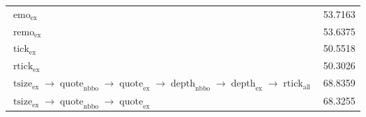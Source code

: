 \begin{tabular}{p{6cm}S}
    $\operatorname{emo}_{\text{ex}}$                                                                                                                                                                                                 & 53.7163    \\
    $\operatorname{remo}_{\text{ex}}$                                                                                                                                                                                                & 53.6375    \\
    $\operatorname{tick}_{\text{ex}}$                                                                                                                                                                                                & 50.5518    \\
    $\operatorname{rtick}_{\text{ex}}$                                                                                                                                                                                               & 50.3026    \\ \midrule
    $\operatorname{tsize}_{\text{ex}} \to \operatorname{quote}_{\text{nbbo}} \to \operatorname{quote}_{\text{ex}} \to \operatorname{depth}_{\text{nbbo}} \to \operatorname{depth}_{\text{ex}} \to \operatorname{rtick}_{\text{all}}$ & 68.8359    \\
    $\operatorname{tsize}_{\text{ex}} \to \operatorname{quote}_{\text{nbbo}} \to \operatorname{quote}_{\text{ex}}$                                                                                                                   & 68.3255    \\ \bottomrule
\end{tabular}